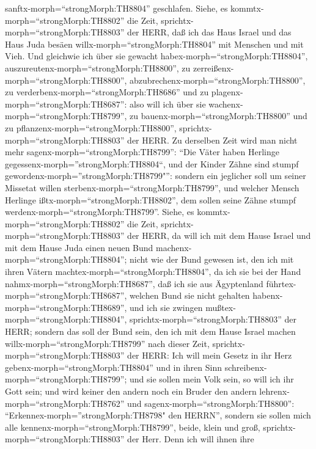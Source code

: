 sanftx-morph=``strongMorph:TH8804'' geschlafen.  Siehe, es
kommtx-morph=``strongMorph:TH8802'' die Zeit,
sprichtx-morph=``strongMorph:TH8803'' der HERR, daß ich das Haus Israel
und das Haus Juda besäen willx-morph=``strongMorph:TH8804'' mit Menschen
und mit Vieh.  Und gleichwie ich über sie gewacht
habex-morph=``strongMorph:TH8804'',
auszureutenx-morph=``strongMorph:TH8800'', zu
zerreißenx-morph=``strongMorph:TH8800'',
abzubrechenx-morph=``strongMorph:TH8800'', zu
verderbenx-morph=``strongMorph:TH8686'' und zu
plagenx-morph=``strongMorph:TH8687'': also will ich über sie
wachenx-morph=``strongMorph:TH8799'', zu
bauenx-morph=``strongMorph:TH8800'' und zu
pflanzenx-morph=``strongMorph:TH8800'',
sprichtx-morph=``strongMorph:TH8803'' der HERR.  Zu
derselben Zeit wird man nicht mehr sagenx-morph=``strongMorph:TH8799'':
``Die Väter haben Herlinge gegessenx-morph=''strongMorph:TH8804``, und
der Kinder Zähne sind stumpf gewordenx-morph=''strongMorph:TH8799"'':
 sondern ein jeglicher soll um seiner Missetat willen
sterbenx-morph=``strongMorph:TH8799'', und welcher Mensch Herlinge
ißtx-morph=``strongMorph:TH8802'', dem sollen seine Zähne stumpf
werdenx-morph=``strongMorph:TH8799''.  Siehe, es
kommtx-morph=``strongMorph:TH8802'' die Zeit,
sprichtx-morph=``strongMorph:TH8803'' der HERR, da will ich mit dem
Hause Israel und mit dem Hause Juda einen neuen Bund
machenx-morph=``strongMorph:TH8804'';  nicht wie der Bund
gewesen ist, den ich mit ihren Vätern
machtex-morph=``strongMorph:TH8804'', da ich sie bei der Hand
nahmx-morph=``strongMorph:TH8687'', daß ich sie aus Ägyptenland
führtex-morph=``strongMorph:TH8687'', welchen Bund sie nicht gehalten
habenx-morph=``strongMorph:TH8689'', und ich sie zwingen
mußtex-morph=``strongMorph:TH8804'',
sprichtx-morph=``strongMorph:TH8803'' der HERR;  sondern
das soll der Bund sein, den ich mit dem Hause Israel machen
willx-morph=``strongMorph:TH8799'' nach dieser Zeit,
sprichtx-morph=``strongMorph:TH8803'' der HERR: Ich will mein Gesetz in
ihr Herz gebenx-morph=``strongMorph:TH8804'' und in ihren Sinn
schreibenx-morph=``strongMorph:TH8799''; und sie sollen mein Volk sein,
so will ich ihr Gott sein;  und wird keiner den andern noch
ein Bruder den andern lehrenx-morph=``strongMorph:TH8762'' und
sagenx-morph=``strongMorph:TH8800'':
``Erkennex-morph=''strongMorph:TH8798" den HERRN'', sondern sie sollen
mich alle kennenx-morph=``strongMorph:TH8799'', beide, klein und groß,
sprichtx-morph=``strongMorph:TH8803'' der Herr. Denn ich will ihnen ihre
